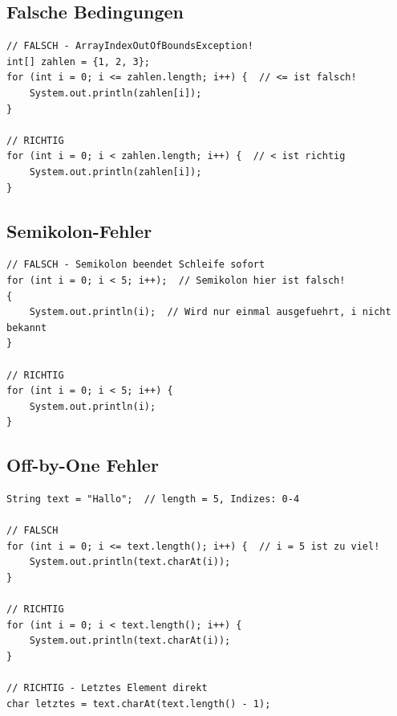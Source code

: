 \subsection*{Falsche Bedingungen}

\begin{lstlisting}
// FALSCH - ArrayIndexOutOfBoundsException!
int[] zahlen = {1, 2, 3};
for (int i = 0; i <= zahlen.length; i++) {  // <= ist falsch!
    System.out.println(zahlen[i]);
}

// RICHTIG
for (int i = 0; i < zahlen.length; i++) {  // < ist richtig
    System.out.println(zahlen[i]);
}
\end{lstlisting}

\subsection*{Semikolon-Fehler}

\begin{lstlisting}
// FALSCH - Semikolon beendet Schleife sofort
for (int i = 0; i < 5; i++);  // Semikolon hier ist falsch!
{
    System.out.println(i);  // Wird nur einmal ausgefuehrt, i nicht bekannt
}

// RICHTIG
for (int i = 0; i < 5; i++) {
    System.out.println(i);
}
\end{lstlisting}

\subsection*{Off-by-One Fehler}

\begin{lstlisting}
String text = "Hallo";  // length = 5, Indizes: 0-4

// FALSCH
for (int i = 0; i <= text.length(); i++) {  // i = 5 ist zu viel!
    System.out.println(text.charAt(i));
}

// RICHTIG
for (int i = 0; i < text.length(); i++) {
    System.out.println(text.charAt(i));
}

// RICHTIG - Letztes Element direkt
char letztes = text.charAt(text.length() - 1);
\end{lstlisting}
